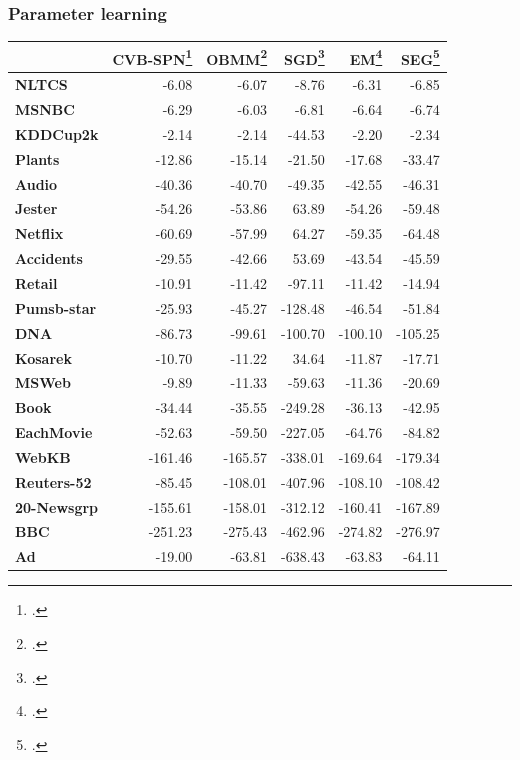\documentclass[10pt, t, xcolor={usenames,dvipsnames,svgnames}, compress]{beamer}
\begin{document}
\begin{frame}[t]
  \frametitle{Parameter learning}
  \begin{table}
    \centering
    \scriptsize
    \setlength{\tabcolsep}{3pt}  
    \begin{tabular}{l r r r r r}
      \toprule
      & \textsf{CVB-SPN}\footcite{Zhao2016a} & \textsf{OBMM}\footcite{Rashwan2016} & \textsf{SGD}\footcite{Rashwan2016} & \textsf{EM}\footcite{Rashwan2016} & \textsf{SEG}\footcite{Rashwan2016} \\
      \midrule
      \textbf{NLTCS}      & -6.08   & -6.07   & -8.76   & -6.31   & -6.85   \\
      \textbf{MSNBC}      & -6.29   & -6.03   & -6.81   & -6.64   & -6.74   \\
      \textbf{KDDCup2k}   & -2.14   & -2.14   & -44.53  & -2.20   & -2.34   \\
      \textbf{Plants}     & -12.86  & -15.14  & -21.50  & -17.68  & -33.47  \\
      \textbf{Audio}      & -40.36  & -40.70  & -49.35  & -42.55  & -46.31  \\
      \textbf{Jester}     & -54.26  & -53.86  & 63.89   & -54.26  & -59.48  \\
      \textbf{Netflix}    & -60.69  & -57.99  & 64.27   & -59.35  & -64.48  \\
      \textbf{Accidents}  & -29.55  & -42.66  & 53.69   & -43.54  & -45.59  \\
      \textbf{Retail}     & -10.91  & -11.42  & -97.11  & -11.42  & -14.94  \\
      \textbf{Pumsb-star} & -25.93  & -45.27  & -128.48 & -46.54  & -51.84  \\
      \textbf{DNA}        & -86.73  & -99.61  & -100.70 & -100.10 & -105.25 \\
      \textbf{Kosarek}    & -10.70  & -11.22  & 34.64   & -11.87  & -17.71  \\
      \textbf{MSWeb}      & -9.89   & -11.33  & -59.63  & -11.36  & -20.69  \\
      \textbf{Book}       & -34.44  & -35.55  & -249.28 & -36.13  & -42.95  \\
      \textbf{EachMovie}  & -52.63  & -59.50  & -227.05 & -64.76  & -84.82  \\
      \textbf{WebKB}      & -161.46 & -165.57 & -338.01 & -169.64 & -179.34 \\
      \textbf{Reuters-52} & -85.45  & -108.01 & -407.96 & -108.10 & -108.42 \\
      \textbf{20-Newsgrp} & -155.61 & -158.01 & -312.12 & -160.41 & -167.89 \\
      \textbf{BBC}        & -251.23 & -275.43 & -462.96 & -274.82 & -276.97 \\
      \textbf{Ad}         & -19.00  & -63.81  & -638.43 & -63.83  & -64.11  \\
      \bottomrule
    \end{tabular}
    \label{tab:model-accs}
  \end{table}

\end{frame}
\end{document}

